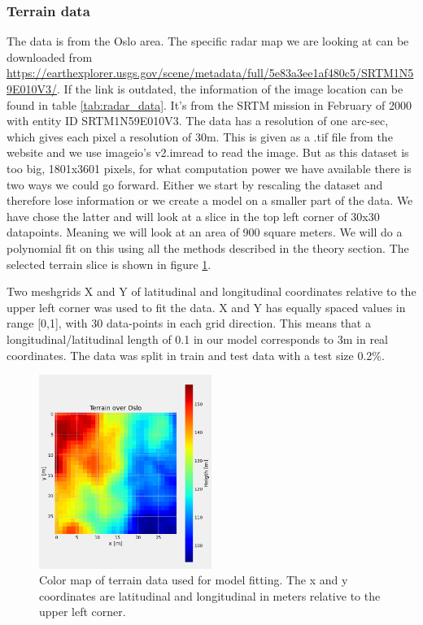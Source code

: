 \subsubsection{Terrain data}
The data is from the Oslo area. The specific radar map we are looking at can be
downloaded from
\href{https://earthexplorer.usgs.gov/scene/metadata/full/5e83a3ee1af480c5/SRTM1N59E010V3/}{https://earthexplorer.usgs.gov/scene/metadata/full/5e83a3ee1af480c5/SRTM1N59E010V3/}.
If the link is outdated, the information of the image location can be found in
table \ref{tab:radar_data}. It's from the SRTM mission in February of 2000 with
entity ID SRTM1N59E010V3. The data has a resolution of one arc-sec, which gives
each pixel a resolution of 30m. This is given as a .tif file from the website
and we use imageio's v2.imread to read the image. But as this dataset is too
big, 1801x3601 pixels, for what computation power we have available there is
two ways we could go forward. Either we start by rescaling the dataset and
therefore lose information or we create a model on a smaller part of the data.
We have chose the latter and will look at a slice in the top left corner of
30x30 datapoints. Meaning we will look at an area of 900 square meters. We will
do a polynomial fit on this using all the methods described in the theory
section. The selected terrain slice is shown in figure \ref{fig:terrain_colormap}. 


Two meshgrids X and Y of latitudinal and longitudinal coordinates relative to
the upper left corner was used to fit the data. X and Y has equally spaced
values in range [0,1], with 30 data-points in each grid direction. This means
that a longitudinal/latitudinal length of 0.1 in our model corresponds to 3m in
real coordinates. The data was split in train and test data with a test size
0.2\%. 

\begin{figure}[H]
    \centering
    \includegraphics[width=0.5\textwidth]{Figures/terrain_colormap.png}
    \caption{Color map of terrain data used for model fitting. The x and y
        coordinates are latitudinal and longitudinal in meters relative to the upper left
    corner.}  
    \label{fig:terrain_colormap} 
\end{figure}


